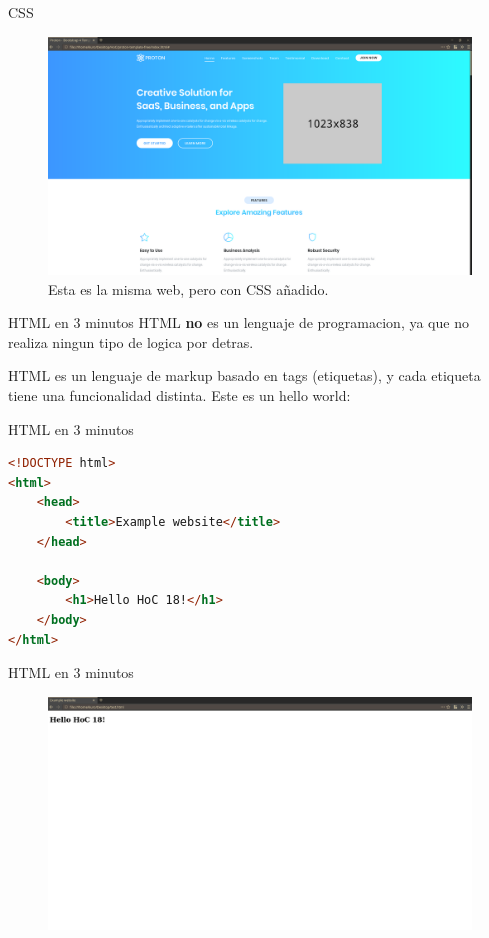 \documentclass{beamer}
\begin{document}
\begin{frame}{CSS}
\begin{figure}
    \centering
    \includegraphics[width=\textwidth]{images/css.png}
    \caption{Esta es la misma web, pero con CSS añadido.}
\end{figure}
\end{frame}

\begin{frame}{HTML en 3 minutos}
HTML \textbf{no} es un lenguaje de programacion, ya que no realiza ningun tipo de logica por detras.

HTML es un lenguaje de markup basado en tags (etiquetas), y cada etiqueta tiene una funcionalidad distinta. Este es un hello world:
    
\end{frame}

\begin{frame}[fragile]{HTML en 3 minutos}
\begin{lstlisting}[language=HTML]
<!DOCTYPE html>
<html>
    <head>
        <title>Example website</title>
    </head>

    <body>
        <h1>Hello HoC 18!</h1>
    </body>
</html> 
\end{lstlisting}
\end{frame}

\begin{frame}{HTML en 3 minutos}
\begin{figure}
    \centering
    \includegraphics[width=\textwidth]{images/helloworldhtml.png}
\end{figure}
\end{frame}
\end{document}
